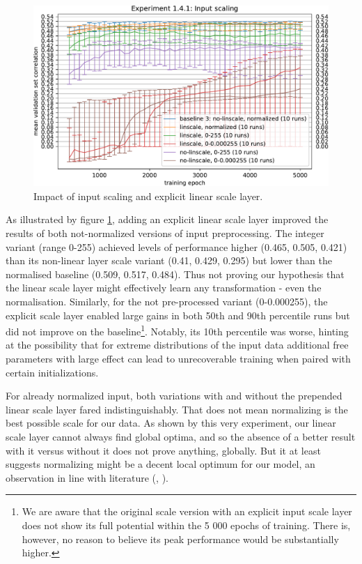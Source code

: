 \begin{figure}[H]
    \centering
    \includegraphics[width=1\textwidth]{../figures/05_1_4_1}
    \caption[Experiment 1.4.1]{Impact of input scaling and explicit linear scale layer.}
    \label{fig:5.1.4.1}
\end{figure}

As illustrated by figure \ref{fig:5.1.4.1}, adding an explicit linear scale layer improved the results of both not-normalized versions of input preprocessing. The integer variant (range 0-255) achieved levels of performance higher (0.465, 0.505, 0.421) than its non-linear layer scale variant (0.41, 0.429, 0.295) but lower than the normalised baseline (0.509, 0.517, 0.484). Thus not proving our hypothesis that the linear scale layer might effectively learn any transformation - even the normalisation. Similarly, for the not pre-processed variant (0-0.000255), the explicit scale layer enabled large gains in both 50th and 90th percentile runs but did not improve on the baseline\footnote{We are aware that the original scale version with an explicit input scale layer does not show its full potential within the 5 000 epochs of training. There is, however, no reason to believe its peak performance would be substantially higher.}. Notably, its 10th percentile was worse, hinting at the possibility that for extreme distributions of the input data additional free parameters with large effect can lead to unrecoverable training when paired with certain initializations.

For already normalized input, both variations with and without the prepended linear scale layer fared indistinguishably. That does not mean normalizing is the best possible scale for our data. As shown by this very experiment, our linear scale layer cannot always find global optima, and so the absence of a better result with it versus without it does not prove anything, globally. But it at least suggests normalizing might be a decent local optimum for our model, an observation in line with literature (\citep{Goodfellow-et-al-2016}, \citep{Jin2015}).


